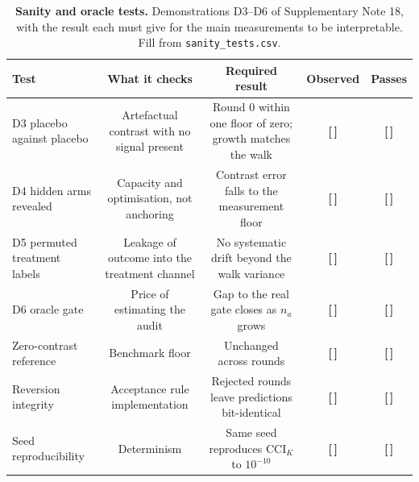 \documentclass[11pt,a4paper]{article}
\newcommand{\T}{{\color{red}\textbf{[\,]}}}
\newcommand{\CCI}{\mathrm{CCI}}
\begin{document}
\FloatBarrier
\begin{table}[!htbp]\centering\scriptsize
\caption{\textbf{Sanity and oracle tests.} Demonstrations D3--D6 of Supplementary Note 18, with the result each must give for the main measurements to be interpretable. Fill from \texttt{sanity\_tests.csv}.}
\label{tab:s46}
\begin{tabularx}{\textwidth}{@{}p{3.9cm} C C C C@{}}\toprule
Test & What it checks & Required result & Observed & Passes\\\midrule
D3 placebo against placebo & Artefactual contrast with no signal present & Round 0 within one floor of zero; growth matches the walk & \T & \T\\
D4 hidden arms revealed & Capacity and optimisation, not anchoring & Contrast error falls to the measurement floor & \T & \T\\
D5 permuted treatment labels & Leakage of outcome into the treatment channel & No systematic drift beyond the walk variance & \T & \T\\
D6 oracle gate & Price of estimating the audit & Gap to the real gate closes as $n_a$ grows & \T & \T\\
Zero-contrast reference & Benchmark floor & Unchanged across rounds & \T & \T\\
Reversion integrity & Acceptance rule implementation & Rejected rounds leave predictions bit-identical & \T & \T\\
Seed reproducibility & Determinism & Same seed reproduces $\CCI_K$ to $10^{-10}$ & \T & \T\\
\bottomrule\end{tabularx}
\end{table}
\FloatBarrier
\end{document}
